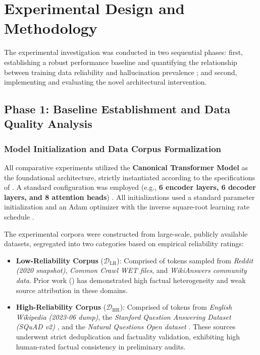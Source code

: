 \section{Experimental Design and Methodology}
\label{sec:methodology}

The experimental investigation was conducted in two sequential phases: first, establishing a robust performance baseline and quantifying the relationship between training data reliability and hallucination prevalence \cite{islam2024comprehensive, cossio2025comprehensive, cao2021hallucination}; and second, implementing and evaluating the novel architectural intervention.

\subsection{Phase 1: Baseline Establishment and Data Quality Analysis}
\label{sec:phase1}

\subsubsection{Model Initialization and Data Corpus Formalization}
\label{sec:model_data_formalization}
All comparative experiments utilized the \textbf{Canonical Transformer Model} as the foundational architecture, strictly instantiated according to the specifications of \cite{vaswani2017attention}. A standard configuration was employed (e.g., \textbf{6 encoder layers, 6 decoder layers, and 8 attention heads}) \cite{vaswani2017attention}. All initializations used a standard parameter initialization and an Adam optimizer with the inverse square-root learning rate schedule \cite{vaswani2017attention}.

The experimental corpora were constructed from large-scale, publicly available datasets, segregated into two categories based on empirical reliability ratings:

\begin{itemize}
    \item \textbf{Low-Reliability Corpus} ($\mathcal{D}_{\text{LR}}$): Comprised of tokens sampled from \textit{Reddit (2020 snapshot)}, \textit{Common Crawl WET files}, and \textit{WikiAnswers community data}. Prior work (\cite{cao2021hallucination, islam2024comprehensive, cossio2025comprehensive}) has demonstrated high factual heterogeneity and weak source attribution in these domains.
    \item \textbf{High-Reliability Corpus} ($\mathcal{D}_{\text{HR}}$): Comprised of tokens from \textit{English Wikipedia (2023-06 dump)}, the \textit{Stanford Question Answering Dataset (SQuAD v2)} \cite{rajpurkar2018squadv2}, and the \textit{Natural Questions Open dataset} \cite{kwiatkowski2019natural}. These sources underwent strict deduplication and factuality validation, exhibiting high human-rated factual consistency in preliminary audits.
\end{itemize}

